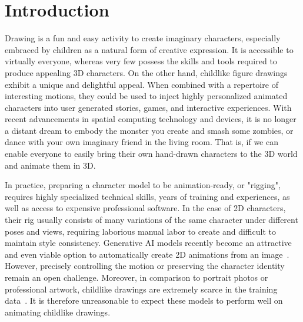 \section{Introduction}


Drawing is a fun and easy activity to create imaginary characters, especially embraced by children as a natural form of creative expression. It is accessible to virtually everyone, whereas very few possess the skills and tools required to produce appealing 3D characters. On the other hand, childlike figure drawings exhibit a unique and delightful appeal. When combined with a repertoire of interesting motions, they could be used to inject highly personalized animated characters into user generated stories, games, and interactive experiences. With recent advancements in spatial computing technology and devices, it is no longer a distant dream to embody the monster you create and smash some zombies, or dance with your own imaginary friend in the living room. That is, if we can enable everyone to easily bring their own hand-drawn characters to the 3D world and animate them in 3D.

In practice, preparing a character model to be animation-ready, or "rigging", requires highly specialized technical skills, years of training and experiences, as well as access to expensive professional software. In the case of 2D characters, their rig usually consists of many variations of the same character under different poses and views, requiring laborious manual labor to create and difficult to maintain style consistency. Generative AI models recently become an attractive and even viable option to automatically create 2D animations from an image~\cite{shi2023zero123}. However, precisely controlling the motion or preserving the character identity remain an open challenge. Moreover, in comparison to portrait photos or professional artwork, childlike drawings are extremely scarce in the training data~\cite{SmithHodgins}. It is therefore unreasonable to expect these models to perform well on animating childlike drawings. %

